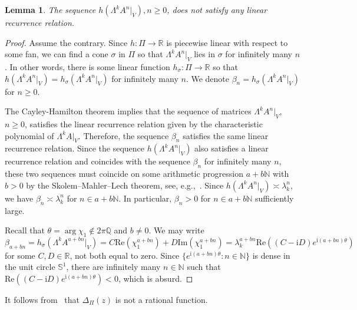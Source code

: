 \documentclass[11pt,a4paper]{article}
\theoremstyle{plain}
\newtheorem{lemma}[theorem]{Lemma}
\theoremstyle{remark}
\theoremstyle{custombold}
\newcommand{\irm}{\mathrm{i}}
\begin{document}
\begin{lemma}\label{k-degree sequence does not satisfy linear recurrence}
The sequence $h(\Lambda^kA^n|_V), n\geq0$, does not satisfy any linear recurrence relation.   
\end{lemma}
\begin{proof}
    Assume the contrary. Since $h\colon\Pi\rightarrow\mathbb R$ is piecewise linear with respect to some fan, we can find a cone $\sigma$ in $\Pi$ so that $\Lambda ^kA^n|_V$ lies in $\sigma$ for infinitely many $n$. In other words, there is some linear function $h_{\sigma}\colon\Pi\rightarrow\mathbb R$ so that $h(\Lambda^kA^n|_V)=h_\sigma(\Lambda^kA^n|_V)$ for infinitely many $n$. We denote $\beta_n=h_\sigma(\Lambda^kA^n|_V)$ for $n\geq0$. 
    
    The Cayley-Hamilton theorem implies that the sequence of matrices $\Lambda^kA^n|_V$, $n\geq0$, satisfies the linear recurrence relation given by the characteristic polynomial of $\Lambda^kA|_V$. Therefore, the sequence $\beta_n$ satisfies the same linear recurrence relation. Since the sequence $h(\Lambda^kA^n|_V)$ also satisfies a linear recurrence relation and coincides with the sequence $\beta_n$ for infinitely many $n$, these two sequences must coincide on some arithmetic progression $a+b\mathbb N$ with $b>0$ by the Skolem--Mahler--Lech  theorem, see, e.g.,~\cite[Chapter~4 Exercise~4]{Stanley-Enumerative-Combinatorics-2011}. Since $h(\Lambda^kA^n|_V)\asymp \lambda_k^n$, we have $\beta_n\asymp\lambda_k^n$ for $n\in a+b\mathbb N$. In particular, $\beta_n>0$ for $n\in a+b\mathbb N$ sufficiently large. 

Recall that $\theta=\arg\chi_1\not\in2\pi\mathbb Q$ and $b\neq0$. We may write 
$$\beta_{a+bn}=h_\sigma(\Lambda^kA^{a+bn}|_V)=C\mathrm{Re}(\chi_1^{a+bn})+D\mathrm{Im}(\chi_1^{a+bn})=\lambda_k^{a+bn}\mathrm{Re}((C-\irm D)e^{\irm (a+bn)\theta})$$ 
 for some $C,D\in\mathbb R$, not both equal to zero. Since $\{e^{\irm (a+bn)\theta}:n\in\mathbb N\}$ is dense in the unit circle $\mathbb S^1$, there are infinitely many $n\in\mathbb N$ such that  $\mathrm{Re}((C-\irm D)e^{\irm (a+bn)\theta})<0$, which is absurd.
\end{proof}
 
It follows from~\cite[Theorem~4.1.1]{Stanley-Enumerative-Combinatorics-2011} that $\Delta_{\Pi}(z)$ is not a rational function.
\end{document}
